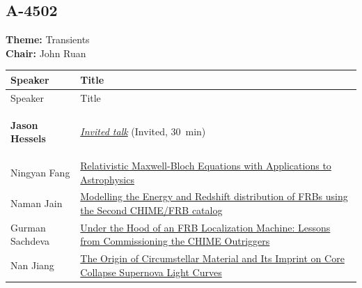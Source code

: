 \subsection*{A-4502}
\textbf{Theme:} Transients\\
\textbf{Chair:} John Ruan\\
{\small
{}
\sloppy
\setlength{\emergencystretch}{1em}
\begin{longtable}{@{}>{\TableRaggedRight\arraybackslash\hspace{0pt}}p{} >{\TableRaggedRight\arraybackslash\hspace{0pt}}p{}@{}}
\toprule
Speaker & Title \\
\midrule
\endfirsthead
\toprule
Speaker & Title \\
\midrule
\endhead
\hypertarget{invited-jason-hessels-sched}{}\label{invited-page-jason-hessels-sched}{\bfseries\color{cascagold}Jason Hessels} & \hyperlink{invited-jason-hessels}{\emph{Invited talk}} {\small\color{cascagold}(Invited, 30~min)} \\
\hypertarget{schedule-talk-161}{}\label{schedule-page-talk-161}Ningyan Fang & \hyperlink{abstract-talk-161}{Relativistic Maxwell-Bloch Equations with Applications to Astrophysics} \\
\hypertarget{schedule-talk-33}{}\label{schedule-page-talk-33}Naman Jain & \hyperlink{abstract-talk-33}{Modelling the Energy and Redshift distribution of FRBs using the Second CHIME/FRB catalog} \\
\hypertarget{schedule-talk-304}{}\label{schedule-page-talk-304}Gurman Sachdeva & \hyperlink{abstract-talk-304}{Under the Hood of an FRB Localization Machine: Lessons from Commissioning the CHIME Outriggers} \\
\hypertarget{schedule-talk-269}{}\label{schedule-page-talk-269}Nan Jiang & \hyperlink{abstract-talk-269}{The Origin of Circumstellar Material and Its Imprint on Core Collapse Supernova Light Curves} \\
\bottomrule
\end{longtable}
}

\hypertarget{schedule-tuesday-afternoon-a-3561}{}

